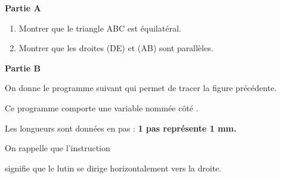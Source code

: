 \documentclass[11pt]{article}
\begin{document}
\textbf{Partie A}

\begin{enumerate}
	\item Montrer que le triangle ABC est équilatéral.

	\item Montrer que les droites (DE) et (AB) sont parallèles.

\end{enumerate}

\textbf{Partie B}

On donne le programme suivant qui permet de tracer la figure précédente.

Ce programme comporte une variable nommée \og{} côté \fg{}.

Les longueurs sont données en pas : \textbf{1 pas représente 1 mm.}

On rappelle que l'instruction \begin{scratch} \end{scratch} signifie que le lutin se dirige horizontalement vers la droite.
\end{document}
